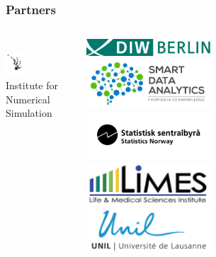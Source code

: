 \begin{frame}\frametitle{Partners}\vspace{1.0cm}

\begin{columns}[t]
	\centering \\
  \includegraphics[width=0.3\textwidth]{material/crop-cooperation-ins.png} \\\vspace{-0.5cm}
  \footnotesize{Institute for \\ Numerical Simulation}\vspace{0.3cm}



	\centering
	\includegraphics[width=0.45\textwidth]{material/crop-cooperation-diw.png}\\
	\includegraphics[width=0.45\textwidth]{material/crop-cooperation-sda.png}\\

	\includegraphics[width=0.45\textwidth]{material/crop-cooperation-ssb.png}\\

  \includegraphics[width=0.45\textwidth]{material/crop-cooperation-limes.png}\\
	\vspace{1.75cm}
  \includegraphics[width=0.45\textwidth]{material/crop-cooperation-lausanne.png} \\


\end{columns}
\end{frame}

